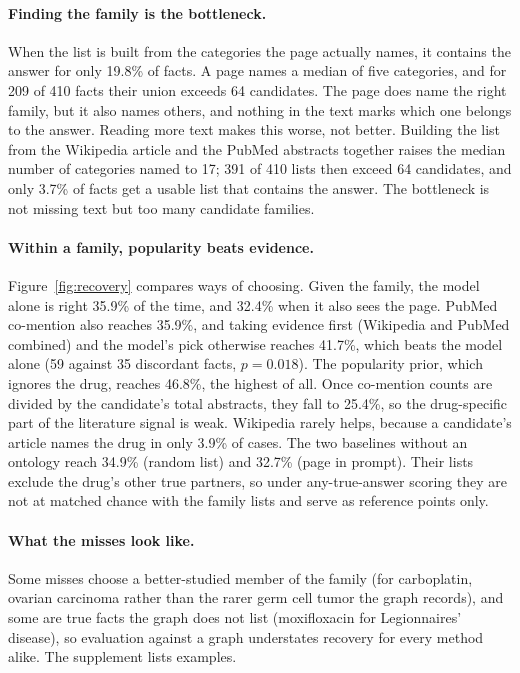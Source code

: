 \documentclass[letterpaper]{article} %
\begin{document}
\paragraph{Finding the family is the bottleneck.}
When the list is built from the categories the page actually names, it
contains the answer for only 19.8\% of facts. A page names a median of five
categories, and for 209 of 410 facts their union exceeds 64 candidates. The
page does name the right family, but it also names others, and nothing in the
text marks which one belongs to the answer. Reading more text makes this worse,
not better. Building the list from the Wikipedia article and the PubMed
abstracts together raises the median number of categories named to 17; 391 of
410 lists then exceed 64 candidates, and only 3.7\% of facts get a usable list
that contains the answer. The bottleneck is not missing text but too many
candidate families.

\paragraph{Within a family, popularity beats evidence.}
Figure~\ref{fig:recovery} compares ways of choosing. Given the family, the
model alone is right 35.9\% of the time, and 32.4\% when it also sees the
page. PubMed co-mention also reaches 35.9\%, and taking evidence first
(Wikipedia and PubMed combined) and the model's pick otherwise reaches 41.7\%,
which beats the model alone (59 against 35 discordant facts, $p = 0.018$). The
popularity prior, which ignores the drug, reaches 46.8\%, the highest of all.
Once co-mention counts are divided by the candidate's total abstracts, they
fall to 25.4\%, so the drug-specific part of the literature signal is weak.
Wikipedia rarely helps, because a candidate's article names the drug in only
3.9\% of cases. The two baselines without an ontology reach 34.9\% (random
list) and 32.7\% (page in prompt). Their lists exclude the drug's other true
partners, so under any-true-answer scoring they are not at matched chance with
the family lists and serve as reference points only.


\paragraph{What the misses look like.}
Some misses choose a better-studied member of the family (for carboplatin,
ovarian carcinoma rather than the rarer germ cell tumor the graph records), and
some are true facts the graph does not list (moxifloxacin for Legionnaires'
disease), so evaluation against a graph understates recovery for every method
alike. The supplement lists examples.
\end{document}
